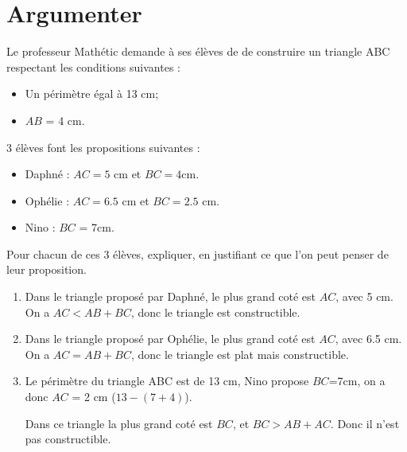 \section{Argumenter}

Le professeur Mathétic demande à ses élèves de  de construire un triangle ABC respectant les conditions suivantes :

\begin{itemize}
	\item Un périmètre égal à 13 cm;
	\item $AB$ = 4 cm.
\end{itemize}

3 élèves font les propositions suivantes :
\begin{itemize}
	\item Daphné : $AC = 5$ cm et $BC= \num{4}$cm.
	\item Ophélie :  $AC = \num{6.5}$ cm et $BC= \num{2.5}$ cm.
	\item Nino : $BC$ = 7cm.
\end{itemize}

\begin{questions}
	\question Pour chacun de ces 3 élèves, expliquer, en justifiant ce que l'on peut penser de leur proposition.
	
	\begin{solution}
		\begin{enumerate}
			\item Dans le triangle proposé par Daphné, le plus grand coté est $AC$, avec 5 cm. On a $AC < AB + BC$, donc le triangle est constructible.
			
			\item Dans le triangle proposé par Ophélie, le plus grand coté est $AC$, avec \num{6.5} cm. On a $AC = AB + BC$, donc le triangle est plat mais constructible.
			
			\item Le périmètre du triangle ABC est de 13 cm, Nino propose $BC$=7cm, on a donc $AC$ = 2 cm ($13 - (7 + 4)$).
			
			Dans ce triangle la plus grand coté est $BC$, et $BC > AB + AC$. Donc il n'est pas constructible.
		\end{enumerate}
	\end{solution}
\end{questions}